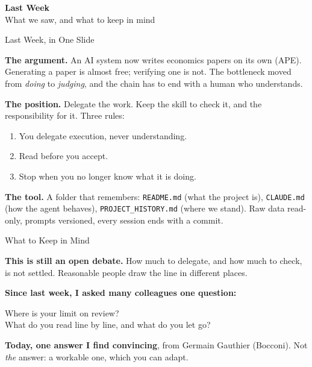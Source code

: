 \documentclass[svgnames,x11names,dvipsnames]{beamer}
\begin{document}
\begin{frame}[plain]
  \centering
  \vfill
  {\LARGE \textbf{\textcolor{titleblue}{Last Week}}}\\[0.4cm]
  {What we saw, and what to keep in mind}
  \vfill
\end{frame}

\begin{frame}{Last Week, in One Slide}

\small
\textbf{The argument.} An AI system now writes economics papers on its own (APE). Generating a paper is almost free; verifying one is not. The bottleneck moved from \emph{doing} to \emph{judging}, and the chain has to end with a human who understands.

\vspace{0.25cm}

\textbf{The position.} Delegate the work. Keep the skill to check it, and the responsibility for it. Three rules:
\begin{enumerate}
    \setlength{\itemsep}{0pt}
    \item You delegate execution, never understanding.
    \item Read before you accept.
    \item Stop when you no longer know what it is doing.
\end{enumerate}

\vspace{0.25cm}

\textbf{The tool.} A folder that remembers: \texttt{README.md} (what the project is), \texttt{CLAUDE.md} (how the agent behaves), \texttt{PROJECT\_HISTORY.md} (where we stand). Raw data read-only, prompts versioned, every session ends with a commit.

\end{frame}

\begin{frame}{What to Keep in Mind}

\textbf{This is still an open debate.} How much to delegate, and how much to check, is not settled. Reasonable people draw the line in different places.

\vspace{0.45cm}

\textbf{Since last week, I asked many colleagues one question:}

\vspace{0.3cm}

\centering
{\Large \alert{Where is your limit on review?}}\\[0.2cm]
{\small What do you read line by line, and what do you let go?}

\vspace{0.45cm}
\raggedright

\textbf{Today, one answer I find convincing}, from Germain Gauthier (Bocconi).
Not \emph{the} answer: a workable one, which you can adapt.

\vspace{0.35cm}

\end{frame}
\end{document}
